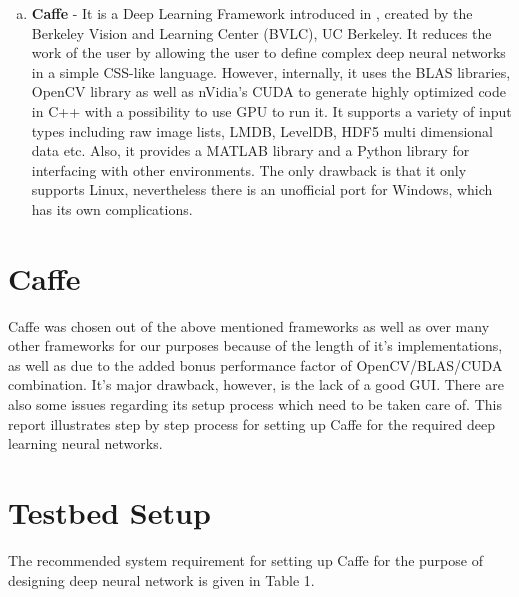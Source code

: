 \documentclass{article}
\begin{document}
\begin{enumerate}[a)]
	\item \textbf{Caffe} - It is a Deep Learning Framework introduced in \cite{caffe}, created by the Berkeley Vision and Learning Center (BVLC), UC Berkeley. It reduces the work of the user by allowing the user to define complex deep neural networks in a simple CSS-like language. However, internally, it uses the BLAS libraries, OpenCV library as well as nVidia's CUDA to generate highly optimized code in C++ with a possibility to use GPU to run it. It supports a variety of input types including raw image lists, LMDB, LevelDB, HDF5 multi dimensional data etc. Also, it provides a MATLAB library and a Python library for interfacing with other environments. The only drawback is that it only supports Linux, nevertheless there is an unofficial port for Windows, which has its own complications.
\end{enumerate}

\section{Caffe}
Caffe was chosen out of the above mentioned frameworks as well as over many other frameworks for our purposes because of the length of it's implementations, as well as due to the added bonus performance factor of OpenCV/BLAS/CUDA combination. It's major drawback, however, is the lack of a good GUI. There are also some issues regarding its setup process which need to be taken care of. This report illustrates step by step process for setting up Caffe for the required deep learning neural networks.

\section{Testbed Setup}
The recommended system requirement for setting up Caffe for the purpose of designing deep neural
network is given in Table 1.
\end{document}
